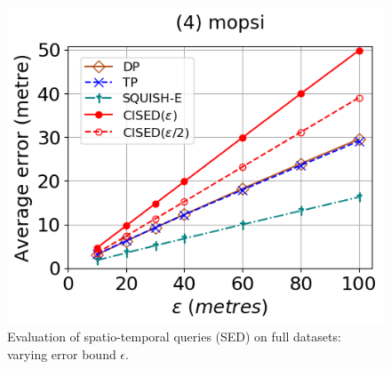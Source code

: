 \begin{figure}[tb!]
	\includegraphics[scale = 0.320]{Figures/Exp-query-SED-error-epsilon-mopsi.png}\hspace{3ex}
	\caption{\small Evaluation of spatio-temporal queries (SED) on full datasets: varying error bound $\epsilon$.}
	\label{fig:query-sed-epsilon}
\end{figure}

